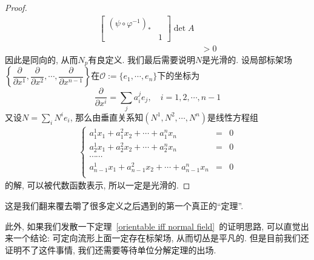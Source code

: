 \begin{proof}
\begin{align*}
{            \begin{bmatrix}
                (\psi\circ\varphi^{-1})_* & \\
                & 1
            \end{bmatrix}
        }\det{A}\\
        &>0
    \end{align*}
    因此是同向的, 从而$N_p$有良定义.
    我们最后需要说明$N$是光滑的.
    设局部标架场$\left\{\dfrac{\partial}{\partial x^1},\dfrac{\partial}{\partial x^2},\cdots,\dfrac{\partial}{\partial x^{n-1}}\right\}$在$\mathcal{O}:=\{e_1,\cdots,e_n\}$下的坐标为
    \[\frac{\partial}{\partial x^i}=\sum_{j}a^j_ie_j,\quad i=1,2,\cdots,n-1\]
    又设$\displaystyle N=\sum_{i}N^ie_i$, 那么由垂直关系知$(N^1,N^2,\cdots,N^n)$是线性方程组
    \begin{align*}
        \left\{\begin{array}{ccc}
            a^1_1x_1+a^2_1x_2+\cdots+a^n_1x_n & = & 0\\
            a^1_2x_1+a^2_2x_2+\cdots+a^n_2x_n & = & 0\\
            \cdots\cdots & & \\
            a^1_{n-1}x_1+a^2_{n-1}x_2+\cdots+a^n_{n-1}x_n & = & 0\\
        \end{array}\right.
    \end{align*}
    的解, 可以被代数函数表示, 所以一定是光滑的.
\end{proof} %

这是我们翻来覆去嚼了很多定义之后遇到的第一个真正的``定理''.

此外, 如果我们发散一下定理~\ref{orientable iff normal field}~的证明思路, 可以直觉出来一个结论:
可定向流形上面一定存在标架场, 从而切丛是平凡的.
但是目前我们还证明不了这件事情, 我们还需要等待单位分解定理的出场.

